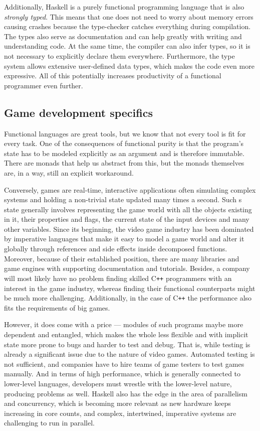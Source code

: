 \documentclass[
  digital, %
  color,   %
  table,   %
  oneside, %
  lof,     %
  lot,     %
]{fithesis3}
\newcommand{\cpp}{C\nolinebreak\texttt{+}\nolinebreak\texttt{+}}
\begin{document}
Additionally, Haskell is a purely functional programming language that
is also \emph{strongly typed}. This means that one
does not need to worry about memory errors causing crashes because
the type-checker catches everything during compilation.
The types also serve as documentation and can help greatly
with writing and understanding code. At the same time,
the compiler can also infer types, so it
is not necessary to explicitly declare them everywhere.
Furthermore, the type system allows extensive user-defined data types,
which makes the code even more expressive.
All of this potentially increases productivity of a functional programmer even further.


\subsection{Game development specifics}
Functional languages are great tools, but we know that not every tool is
fit for every task. One of the consequences of functional purity is
that the program's state has to be modeled explicitly as an argument
and is therefore immutable. There are monads that help us abstract
from this, but the monads themselves are, in a way, still an explicit workaround.

Conversely, games are real-time, interactive applications often simulating
complex systems and holding a non-trivial state updated many times a second.
Such s state generally involves representing
the game world with all the objects existing in it, their properties and flags,
the current state of the input devices and many other variables. Since its beginning,
the video game industry has been dominated by imperative languages
that make it easy to model a game world and alter it globally through
references and side effects inside decomposed functions. Moreover, because
of their established position, there are many libraries and game engines
with supporting documentation and tutorials. Besides, a company will most likely
have no problem finding skilled \cpp{} programmers with an interest
in the game industry, whereas finding their functional counterparts
might be much more challenging. Additionally, in the case of \cpp{} the performance
also fits the requirements of big games.

However, it does come with a price --- modules of such programs maybe
more dependent and entangled, which makes the whole less flexible and with
implicit state more prone to bugs and harder to test and debug.
That is, while testing is already a significant issue due to the nature of video games.
Automated testing is not sufficient, and companies have to hire teams
of game testers to test games manually. And in terms of high performance,
which is generally connected to lower-level languages, developers must
wrestle with the lower-level nature, producing problems as well.
Haskell also has the edge in the area of parallelism and concurrency,
which is becoming more relevant as new hardware keeps increasing in core counts,
and complex, intertwined, imperative systems are challenging to run in parallel.
\end{document}
